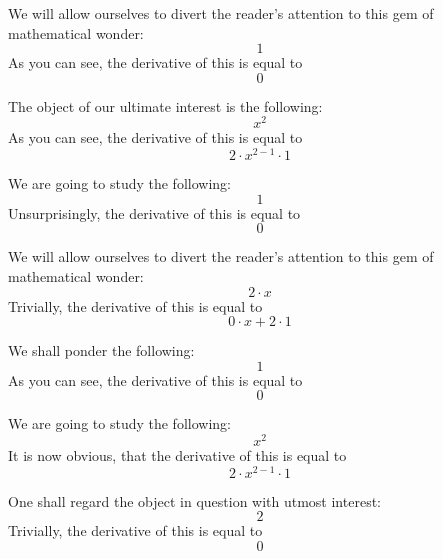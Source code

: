\documentclass{article}
\begin{document}
We will allow ourselves to divert the reader's attention to this gem of mathematical wonder:
\begin{equation}
1 
\end{equation}
As you can see, the derivative of this is equal to
\begin{equation}
0 
\end{equation}

The object of our ultimate interest is the following:
\begin{equation}
x ^{2 } 
\end{equation}
As you can see, the derivative of this is equal to
\begin{equation}
2 \cdot x ^{2 - 1 } \cdot 1 
\end{equation}

We are going to study the following:
\begin{equation}
1 
\end{equation}
Unsurprisingly, the derivative of this is equal to
\begin{equation}
0 
\end{equation}

We will allow ourselves to divert the reader's attention to this gem of mathematical wonder:
\begin{equation}
2 \cdot x 
\end{equation}
Trivially, the derivative of this is equal to
\begin{equation}
0 \cdot x + 2 \cdot 1 
\end{equation}

We shall ponder the following:
\begin{equation}
1 
\end{equation}
As you can see, the derivative of this is equal to
\begin{equation}
0 
\end{equation}

We are going to study the following:
\begin{equation}
x ^{2 } 
\end{equation}
It is now obvious, that the derivative of this is equal to
\begin{equation}
2 \cdot x ^{2 - 1 } \cdot 1 
\end{equation}

One shall regard the object in question with utmost interest:
\begin{equation}
2 
\end{equation}
Trivially, the derivative of this is equal to
\begin{equation}
0 
\end{equation}
\end{document}
